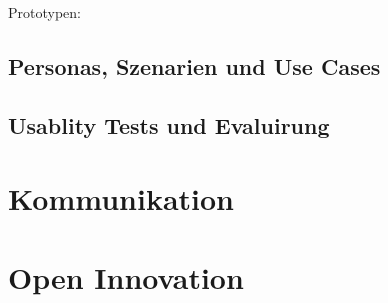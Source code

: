 Prototypen:




\subsection{Personas, Szenarien und Use Cases}




\subsection{Usablity Tests und Evaluirung}

\section{Kommunikation}

\section{Open Innovation}




